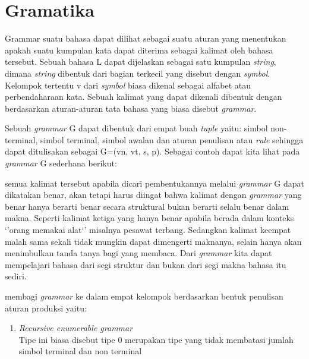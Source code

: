 \section{Gramatika}
Grammar suatu bahasa dapat dilihat sebagai suatu aturan yang menentukan apakah suatu kumpulan kata dapat diterima sebagai kalimat oleh bahasa tersebut. Sebuah bahasa L dapat dijelaskan sebagai satu kumpulan \emph{string}, dimana \emph{string} dibentuk dari bagian terkecil yang disebut dengan \emph{symbol}. Kelompok tertentu v dari \emph{symbol} biasa dikenal sebagai alfabet atau perbendaharaan kata. Sebuah kalimat yang dapat dikenali dibentuk dengan berdasarkan aturan-aturan tata bahasa yang biasa disebut \emph{grammar}.

Sebuah \emph{grammar} G dapat dibentuk dari empat buah \emph{tuple} yaitu: simbol non-terminal, simbol terminal, simbol awalan dan aturan penulisan atau \emph{rule} sehingga dapat ditulisakan sebagai G=(vn, vt, s, p). Sebagai contoh dapat kita lihat pada \emph{grammar} G sederhana berikut:
\begin{figure}[grammar_1]
	\centerin
	\label{fig:grammar1}
\end{figure}
semua kalimat tersebut apabila dicari pembentukannya melalui \emph{grammar} G dapat dikatakan benar, akan tetapi harus diingat bahwa kalimat dengan \emph{grammar} yang benar hanya berarti benar secara struktural bukan berarti selalu benar dalam makna. Seperti kalimat ketiga yang hanya benar apabila berada dalam konteks `'orang memakai alat`' misalnya pesawat terbang. Sedangkan kalimat keempat malah sama sekali tidak mungkin dapat dimengerti maknanya, selain hanya akan menimbulkan tanda tanya bagi yang membaca. Dari \emph{grammar} kita dapat mempelajari bahasa dari segi struktur dan bukan dari segi makna bahasa itu sediri.

\citet{bar_feigenbaum} membagi \emph{grammar} ke dalam empat kelompok berdasarkan bentuk penulisan aturan produksi yaitu:
\begin{enumerate}
	\item \emph{Recursive enumerable grammar}\\
	Tipe ini biasa disebut tipe 0 merupakan tipe yang tidak membatasi jumlah simbol terminal dan non terminal 
\end{enumerate}